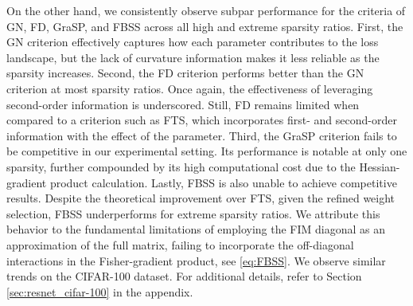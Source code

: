 On the other hand, we consistently observe subpar performance for the criteria of GN, FD, GraSP, and FBSS across all high and extreme sparsity ratios. First, the GN criterion effectively captures how each parameter contributes to the loss landscape, but the lack of curvature information makes it less reliable as the sparsity increases. Second, the FD criterion performs better than the GN criterion at most sparsity ratios. Once again, the effectiveness of leveraging second-order information is underscored. Still, FD remains limited when compared to a criterion such as FTS, which incorporates first- and second-order information with the effect of the parameter. Third, the GraSP criterion fails to be competitive in our experimental setting. Its performance is notable at only one sparsity, further compounded by its high computational cost due to the Hessian-gradient product calculation. Lastly, FBSS is also unable to achieve competitive results. Despite the theoretical improvement over FTS, given the refined weight selection, FBSS underperforms for extreme sparsity ratios. We attribute this behavior to the fundamental limitations of employing the FIM diagonal as an approximation of the full matrix, failing to incorporate the off-diagonal interactions in the Fisher-gradient product, see \eqref{eq:FBSS}. We observe similar trends on the CIFAR-100 dataset. For additional details, refer to Section \ref{sec:resnet_cifar-100} in the appendix.


